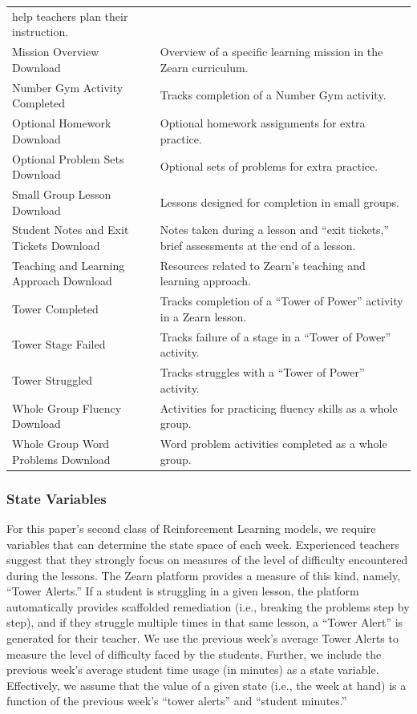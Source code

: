 \documentclass[
  number,
  preprint,
  3p,
  onecolumn]{elsarticle}
\begin{document}
\begin{longtable}[]{@{}
  >{\raggedright\arraybackslash}p{}
  >{\raggedright\arraybackslash}p{}@{}}
help teachers plan their instruction. \\
Mission Overview Download & Overview of a specific learning mission in
the Zearn curriculum. \\
Number Gym Activity Completed & Tracks completion of a Number Gym
activity. \\
Optional Homework Download & Optional homework assignments for extra
practice. \\
Optional Problem Sets Download & Optional sets of problems for extra
practice. \\
Small Group Lesson Download & Lessons designed for completion in small
groups. \\
Student Notes and Exit Tickets Download & Notes taken during a lesson
and ``exit tickets,'' brief assessments at the end of a lesson. \\
Teaching and Learning Approach Download & Resources related to Zearn's
teaching and learning approach. \\
Tower Completed & Tracks completion of a ``Tower of Power'' activity in
a Zearn lesson. \\
Tower Stage Failed & Tracks failure of a stage in a ``Tower of Power''
activity. \\
Tower Struggled & Tracks struggles with a ``Tower of Power''
activity. \\
Whole Group Fluency Download & Activities for practicing fluency skills
as a whole group. \\
Whole Group Word Problems Download & Word problem activities completed
as a whole group. \\
\end{longtable}

\hypertarget{state-variables}{%
\subsubsection{State Variables}\label{state-variables}}

For this paper's second class of Reinforcement Learning models, we
require variables that can determine the state space of each week.
Experienced teachers suggest that they strongly focus on measures of the
level of difficulty encountered during the lessons. The Zearn platform
provides a measure of this kind, namely, ``Tower Alerts.'' If a student
is struggling in a given lesson, the platform automatically provides
scaffolded remediation (i.e., breaking the problems step by step), and
if they struggle multiple times in that same lesson, a ``Tower Alert''
is generated for their teacher. We use the previous week's average Tower
Alerts to measure the level of difficulty faced by the students.
Further, we include the previous week's average student time usage (in
minutes) as a state variable. Effectively, we assume that the value of a
given state (i.e., the week at hand) is a function of the previous
week's ``tower alerts'' and ``student minutes.''
\end{document}
